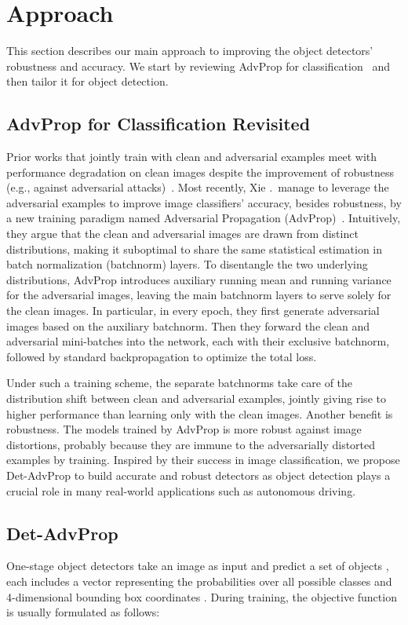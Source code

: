 \documentclass[final]{cvpr}
\begin{document}
\section{Approach}
This section describes our main approach to improving the object detectors' robustness and accuracy. We start by reviewing AdvProp for classification~\cite{xie2020advprop} and then tailor it for object detection.

\subsection{AdvProp for Classification Revisited}
Prior works that jointly train with clean and adversarial examples meet with performance degradation on clean images despite the improvement of robustness (e.g., against adversarial attacks)~\cite{madry2018towards, kurakin2017adversarial, zhang2019trades}.
Most recently, Xie \etal.\ manage to leverage the adversarial examples to improve image classifiers' accuracy, besides robustness,  by a new training paradigm named Adversarial Propagation (AdvProp)~\cite{xie2020advprop}.
Intuitively, they argue that the clean and adversarial images are drawn from distinct distributions, making it suboptimal to share the same statistical estimation in batch normalization (batchnorm) layers.
To disentangle the two underlying distributions, AdvProp introduces auxiliary running mean and running variance for the adversarial images, leaving the main batchnorm layers to serve solely for the clean images.
In particular, in every epoch, they first generate adversarial images based on the auxiliary batchnorm.
Then they forward the clean and adversarial mini-batches into the network, each with their exclusive batchnorm, followed by standard backpropagation to optimize the total loss.

Under such a training scheme, the separate batchnorms take care of the distribution shift between clean and adversarial examples, jointly giving rise to higher performance than learning only with the clean images. 
Another benefit is robustness. The models trained by AdvProp is more robust against image distortions, probably because they are immune to the adversarially distorted examples by training.
Inspired by their success in image classification, we propose Det-AdvProp to build accurate and robust detectors as object detection plays a crucial role in many real-world applications such as autonomous driving.

\subsection{Det-AdvProp}
\label{sec:det-advprop}
One-stage object detectors take an image  as input and predict a set of objects , each includes a vector  representing the probabilities over all possible classes and 4-dimensional bounding box coordinates .
During training, the objective function is usually formulated as follows:
\end{document}
